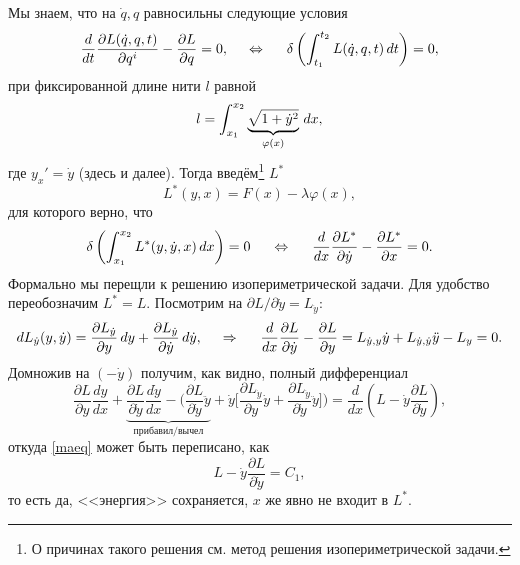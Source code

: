 Мы знаем, что на $\dot{q}, q$ равносильны следующие условия
\begin{equation*}
    \frac{d }{d t} \frac{\partial L(\dot{q}, q, t)}{\partial q^i}  - \frac{\partial L}{\partial q}  = 0,
    \hspace{0.5cm} \Leftrightarrow \hspace{0.5cm} 
    \delta \left(
        \int_{t_1}^{t_2} L(\dot{q}, q, t) \, d t
    \right) = 0,
\end{equation*}
при фиксированной длине нити $l$ равной
\begin{equation}
\label{intl}
    l = \int_{x_1}^{x_2} \underbrace{
    \sqrt{1+\dot{y}^2}
    }_{\varphi(x)} \, d x,
\end{equation}
где $y_x' = \dot{y}$ (здесь и далее). 
Тогда введём\footnote{
    О причинах такого решения см. метод решения изопериметрической задачи.
} $L^*$
\begin{equation}
\label{lstar}
    L^* (y, x) = F(x) - \lambda \varphi(x),
\end{equation}
для которого верно, что
\begin{equation}
\label{maeq}
\delta \left(\int_{x_1}^{x_2} L^*(y, \dot{y}, x) \, d x \right) = 0
\hspace{0.5cm} \Leftrightarrow \hspace{0.5cm} 
    \frac{d}{dx} \frac{\partial L^*}{\partial \dot{y}} -\frac{\partial L^*}{\partial x} = 0.
\end{equation}
Формально мы перещли к решению изопериметрической задачи. Для удобство переобозначим $L^* = L$. 
Посмотрим на $\partial L / \partial \dot{y} = L_{\dot{y}}$:
\begin{equation*}
    d L_{\dot{y}} (y, \dot{y}) = 
    \frac{\partial L_{\dot{y}}}{\partial y} \, d y + 
    \frac{\partial L_{\dot{y}}}{\partial \dot{y}} \, d \dot{y},
    \hspace{0.5cm} \Rightarrow \hspace{0.5cm} 
    \frac{d }{d x} \frac{\partial L}{\partial \dot{y}} -\frac{\partial L}{\partial y} =
    L_{\dot{y}, y} \dot{y} + L_{\dot{y}, \dot{y}} \ddot{y} - L_{y} = 0.
\end{equation*}
Домножив на $(-\dot{y})$ получим, как видно, полный дифференциал 
\begin{equation*}
    \frac{\partial L}{\partial y} \frac{d y}{d x} 
    + \underbrace{
    \frac{\partial L}{\partial \dot{y}} \frac{d \dot{y}}{d x} 
    - \bigg(
        \frac{\partial L}{\partial \dot{y}} \ddot{y}
    }_{\text{прибавил/вычел}}
     + 
        \dot{y} \bigg[
            \frac{\partial L_{\dot{y}}}{\partial y} \dot{y} + \frac{\partial L_{\dot{y}}}{\partial \dot{y}} \ddot{y}
        \bigg]
    \bigg)
    = \frac{d }{d x} \left(
        L - \dot{y} \frac{\partial L}{\partial \dot{y}} 
    \right),
\end{equation*}
откуда \eqref{maeq} может быть переписано, как
\begin{equation*}
    L - \dot{y} \frac{\partial L}{\partial \dot{y}} = C_1,
\end{equation*}
то есть да, <<энергия>> сохраняется, $x$ же явно не входит в $L^*$. 

